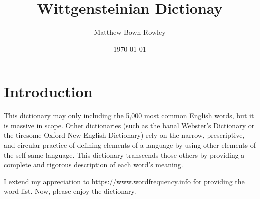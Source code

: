 \documentclass[12pt, letterpaper]{memoir}
\title{Wittgensteinian Dictionay}
\author{Matthew Bown Rowley}
\date{\today}
\begin{document}
\maketitle
\frontmatter
\chapter*{Introduction}
This dictionary may only including the 5,000 most common English words, but it
is massive in scope. Other dictionaries (such as the banal Webster's Dictionary
or the tiresome Oxford New English Dictionary) rely on the narrow, prescriptive,
and circular practice of defining elements of a language by using other
elements of the self-same language. This dictionary transcends those others by
providing a complete and rigorous description of each word's meaning.

I extend my appreciation to \hyperref[https://www.wordfrequency.info]{https://www.wordfrequency.info}
 for providing the word list. Now, please enjoy the dictionary.

\mainmatter
\end{document}
